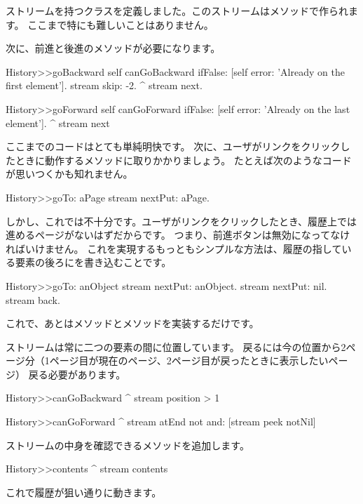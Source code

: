 \documentclass[a4paper,10pt,twoside]{book}
\begin{document}
ストリームを持つクラスを定義しました。このストリームはメソッドで作られます。
ここまで特にも難しいことはありません。

次に、前進と後進のメソッドが必要になります。

\begin{code}{}
History>>goBackward
  self canGoBackward ifFalse: [self error: 'Already on the first element'].
  stream skip: -2.
  ^ stream next.

History>>goForward
  self canGoForward ifFalse: [self error: 'Already on the last element'].
  ^ stream next
\end{code}

ここまでのコードはとても単純明快です。
次に、ユーザがリンクをクリックしたときに動作するメソッドに取りかかりましょう。
たとえば次のようなコードが思いつくかも知れません。

\begin{code}{}
History>>goTo: aPage
    stream nextPut: aPage.
\end{code}

しかし、これでは不十分です。ユーザがリンクをクリックしたとき、履歴上では進めるページがないはずだからです。
つまり、前進ボタンは無効になってなければいけません。
これを実現するもっともシンプルな方法は、履歴の指している要素の後ろにを書き込むことです。


\begin{code}{}
History>>goTo: anObject
  stream nextPut: anObject.
  stream nextPut: nil.
  stream back.
\end{code}

これで、あとはメソッドとメソッドを実装するだけです。

ストリームは常に二つの要素の間に位置しています。
戻るには今の位置から2ページ分（1ページ目が現在のページ、2ページ目が戻ったときに表示したいページ）
戻る必要があります。

\begin{code}{}
History>>canGoBackward
  ^ stream position > 1

History>>canGoForward
  ^ stream atEnd not and: [stream peek notNil]
\end{code}

ストリームの中身を確認できるメソッドを追加します。

\begin{code}{}
History>>contents
  ^ stream contents
\end{code}

これで履歴が狙い通りに動きます。
\end{document}
